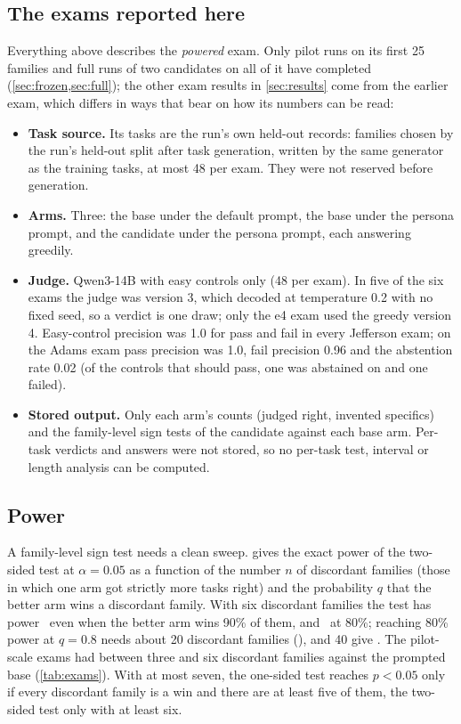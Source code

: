 \subsection{The exams reported here}\label{sec:exam-versions}

Everything above describes the \emph{powered} exam. Only pilot runs on its first 25
families and full runs of two candidates on all of it have completed
(\cref{sec:frozen,sec:full}); the other exam results in \cref{sec:results}
come from the earlier exam, which differs in ways that bear on how its numbers can be read:
\begin{itemize}
\item \textbf{Task source.} Its tasks are the run's own held-out records: families chosen by
  the run's held-out split after task generation, written by the same generator as the
  training tasks, at most 48 per exam. They were not reserved before generation.
\item \textbf{Arms.} Three: the base under the default prompt, the base under the persona
  prompt, and the candidate under the persona prompt, each answering greedily.
\item \textbf{Judge.} Qwen3-14B with easy controls only (48 per exam). In five of the six
  exams the judge was version 3, which decoded at temperature 0.2 with no fixed seed, so a
  verdict is one draw; only the e4 exam used the greedy version 4. Easy-control precision
  was 1.0 for pass and fail in every Jefferson exam; on the Adams exam pass precision was
  1.0, fail precision 0.96 and the abstention rate 0.02 (of the controls that should pass, one was
  abstained on and one failed).
\item \textbf{Stored output.} Only each arm's counts (judged right, invented specifics) and
  the family-level sign tests of the candidate against each base arm. Per-task verdicts and
  answers were not stored, so no per-task test, interval or length analysis can be computed.
\end{itemize}

\subsection{Power}\label{sec:power}

A family-level sign test needs a clean sweep.  gives the exact power of
the two-sided test at $\alpha=0.05$ as a function of the number $n$ of discordant
families (those in which one arm got strictly more tasks right) and the probability $q$
that the better arm wins a discordant family. With six discordant families the test has
power \PowerSixNine\ even when the better arm wins 90\% of them, and \PowerSixEight\ at
80\%; reaching 80\% power at $q=0.8$ needs about 20 discordant families
(\PowerTwentyEight), and 40 give \PowerFortyEight. The pilot-scale exams had between three
and six discordant families against the prompted base (\cref{tab:exams}). With at most
seven, the one-sided test reaches $p<0.05$ only if every discordant family is a win and
there are at least five of them, the two-sided test only with at least six.

